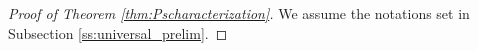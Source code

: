 \documentclass[a4paper,12pt]{amsart}
\theoremstyle{plain}
\theoremstyle{definition}
\theoremstyle{remark}
\newtheorem{remark}[subsection]{{\it Remark}}
\numberwithin{equation}{subsection}
\DeclareMathOperator{\Sym}{Sym}
\DeclareMathOperator{\mypartial}{\partial}
\begin{document}



\begin{proof}[Proof of Theorem \ref{thm:Pscharacterization}]
    We assume the notations set in Subsection \ref{ss:universal_prelim}.


\end{proof}
\end{document}
